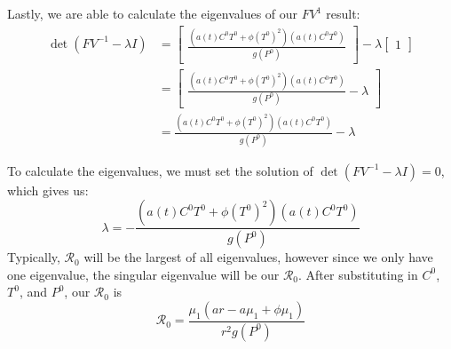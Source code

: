 \documentclass[12pt]{article}
\begin{document}
        Lastly, we are able to calculate the eigenvalues of our $FV^{1}$ result:
        \begin{align*}
            \det(FV^{-1} - \lambda I) &= \begin{bmatrix}
                                            \frac{(a(t)C^{0}T^{0}+\phi (T^{0})^{2})(a(t)C^{0}T^{0})}{g(P^{0})}
                                        \end{bmatrix}
                                        - \lambda
                                        \begin{bmatrix}
                                            1 
                                        \end{bmatrix}
                                    \\
                                    &= \begin{bmatrix}
                                            \frac{(a(t)C^{0}T^{0}+\phi (T^{0})^{2})(a(t)C^{0}T^{0})}{g(P^{0})} - \lambda 
                                        \end{bmatrix}
                                    \\
                                    &= \frac{(a(t)C^{0}T^{0}+\phi (T^{0})^{2})(a(t)C^{0}T^{0})}{g(P^{0})} - \lambda
        \end{align*}
        
        To calculate the eigenvalues, we must set the solution of $\det(FV^{-1} - \lambda I) = 0$, which gives us:
        \begin{equation*}
            \lambda = -\frac{(a(t)C^{0}T^{0}+\phi (T^{0})^{2})(a(t)C^{0}T^{0})}{g(P^{0})}
        \end{equation*}
        Typically, $\mathscr{R}_{0}$ will be the largest of all eigenvalues, however since we only have one eigenvalue, the singular eigenvalue will be our $\mathscr{R}_{0}$. After substituting in $C^{0}$, $T^{0}$, and $P^{0}$, our $\mathscr{R}_{0}$ is
        \begin{equation*}
            \mathscr{R}_{0} = \frac{\mu_{1}(a r - a\mu_{1} + \phi \mu_{1})}{r^{2}g(P^{0})}
        \end{equation*}


    
\end{document}
